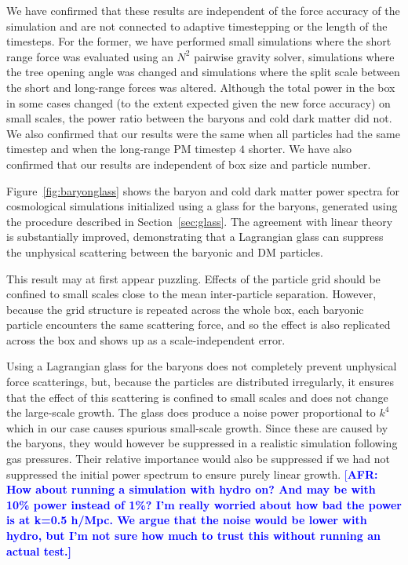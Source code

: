 \documentclass[a4paper,11pt]{article}
\newcommand{\AFR}[1]{\textcolor{blue}{[\bf AFR: #1]} }
\begin{document}
We have confirmed that these results are independent of the force accuracy of the simulation and are not connected to adaptive timestepping or the length of the timesteps. For the former, we have performed small simulations where the short range force was evaluated using an $N^2$ pairwise gravity solver, simulations where the tree opening angle was changed and simulations where the split scale between the short and long-range forces was altered. Although the total power in the box in some cases changed (to the extent expected given the new force accuracy) on small scales, the power ratio between the baryons and cold dark matter did not.
We also confirmed that our results were the same when all particles had the same timestep and when the long-range PM timestep $4$ shorter. We have also confirmed that our results are independent of box size and particle number.

Figure~\ref{fig:baryonglass} shows the baryon and cold dark matter power spectra for cosmological simulations initialized using a glass for the baryons, generated using the procedure described in Section~\ref{sec:glass}. The agreement with linear theory is substantially improved, demonstrating that a Lagrangian glass can suppress the unphysical scattering between the baryonic and DM particles.

This result may at first appear puzzling. Effects of the particle grid should be confined to small scales close to the mean inter-particle separation. However, because the grid structure is repeated across the whole box, each baryonic particle encounters the same scattering force, and so the effect is also replicated across the box and shows up as a scale-independent error.

Using a Lagrangian glass for the baryons does not completely prevent unphysical force scatterings, but, because the particles are distributed irregularly, it ensures that the effect of this scattering is confined to small scales and does not change the large-scale growth. The glass does produce a noise power proportional to $k^4$ which in our case causes spurious small-scale growth. Since these are caused by the baryons, they would however be suppressed in a realistic simulation following gas pressures. Their relative importance would also be suppressed if we had not suppressed the initial power spectrum to ensure purely linear growth.
\AFR{How about running a simulation with hydro on? And may be with 10\% power instead of 1\%? I'm really worried about how bad the power is at k=0.5 h/Mpc. We argue that the noise would be lower with hydro, but I'm not sure how much to trust this without running an actual test.} 
\end{document}
